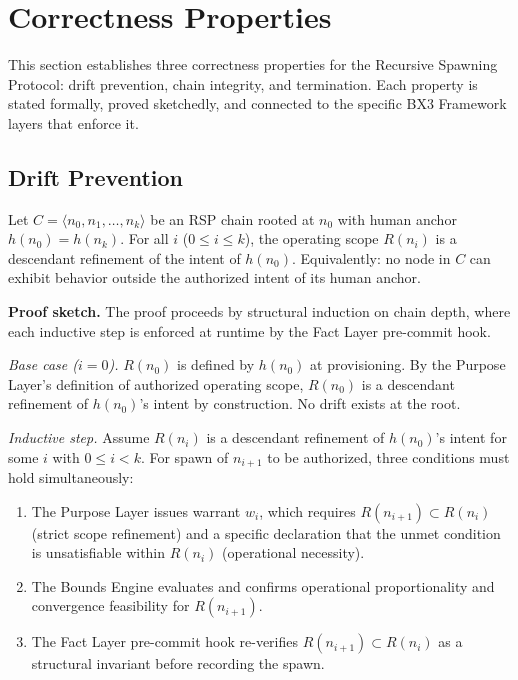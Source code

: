 \section{Correctness Properties}
\label{sec:rs-correctness}

This section establishes three correctness properties for the Recursive Spawning
Protocol: drift prevention, chain integrity, and termination.  Each property is
stated formally, proved sketchedly, and connected to the specific BX3 Framework
layers that enforce it.

\subsection{Drift Prevention}
\label{sec:rs-drift-prevention}

\begin{thrm}
\label{thrm:drift-prevention}
Let $C = \langle n_0, n_1, \ldots, n_k \rangle$ be an RSP chain rooted at $n_0$
with human anchor $h(n_0) = h(n_k)$.  For all $i$ ($0 \leq i \leq k$), the
operating scope $R(n_i)$ is a descendant refinement of the intent of $h(n_0)$.
Equivalently: no node in $C$ can exhibit behavior outside the authorized intent
of its human anchor.
\end{thrm}

\medskip\noindent\textbf{Proof sketch.}  The proof proceeds by structural
induction on chain depth, where each inductive step is enforced at runtime by the
Fact Layer pre-commit hook.

\medskip\noindent\textit{Base case ($i=0$).}  $R(n_0)$ is defined by $h(n_0)$
at provisioning.  By the Purpose Layer's definition of authorized operating
scope, $R(n_0)$ is a descendant refinement of $h(n_0)$'s intent by construction.
No drift exists at the root.

\medskip\noindent\textit{Inductive step.}  Assume $R(n_i)$ is a descendant
refinement of $h(n_0)$'s intent for some $i$ with $0 \leq i < k$.  For spawn of
$n_{i+1}$ to be authorized, three conditions must hold simultaneously:

\begin{enumerate}
  \item[(i)] The Purpose Layer issues warrant $w_i$, which requires
    $R(n_{i+1}) \subset R(n_i)$ (strict scope refinement) and a specific
    declaration that the unmet condition is unsatisfiable within $R(n_i)$
    (operational necessity).
  \item[(ii)] The Bounds Engine evaluates and confirms operational
    proportionality and convergence feasibility for $R(n_{i+1})$.
  \item[(iii)] The Fact Layer pre-commit hook re-verifies
    $R(n_{i+1}) \subset R(n_i)$ as a structural invariant before recording
    the spawn.
\end{enumerate}


